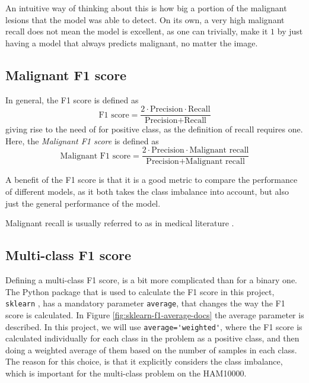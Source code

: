 An intuitive way of thinking about this is how big a portion of the malignant lesions
that the model was able to detect.
On its own, a very high malignant recall does not mean the model is excellent,
as one can trivially, make it $1$ by just having a model that always predicts malignant, no matter the image.

\subsection{Malignant F1 score}
In general, the F1 score is defined as
\[
    \text{F1 score} = \frac{2 \cdot \text{Precision} \cdot \text{Recall}}{\text{Precision} + \text{Recall}}
\]
giving rise to the need of for positive class, as the definition of recall requires one.
Here, the \textit{Malignant F1 score} is defined as
\[
    \text{Malignant F1 score} = \frac{2\cdot \text{Precision} \cdot \text{Malignant recall}}{\text{Precision} + \text{Malignant recall}}
\]

A benefit of the F1 score is that it is a good metric to compare the performance of different models,
as it both takes the class imbalance into account,
but also just the general performance of the model.

Malignant recall is usually referred to as  in medical literature
\cite{sensitivity-and-specificity}.

\subsection{Multi-class F1 score}
Defining a multi-class F1 score, is a bit more complicated than for a binary one.
The Python package that is used to calculate the F1 score in this project, \verb|sklearn|
\cite{sklearn}, has a mandatory parameter \verb|average|, that changes the way the F1 score is calculated.
In Figure \ref{fig:sklearn-f1-average-docs} the average parameter is described.
In this project, we will use \verb|average='weighted'|, where the F1 score is calculated
individually for each class in the problem as a positive class,
and then doing a weighted average of them based
on the number of samples in each class.
The reason for this choice,
is that it explicitly considers the class imbalance,
which is important for the multi-class problem on the HAM10000.


